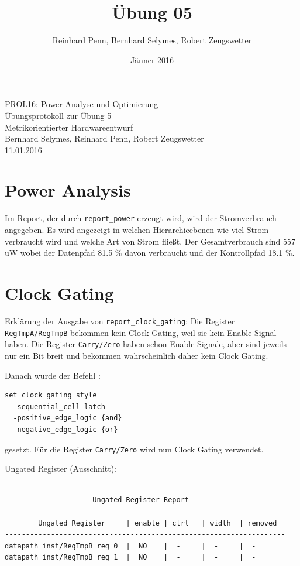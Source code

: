 \documentclass[12pt,a4paper]{article}
\begin{document}
\title{Übung 05}
\author{Reinhard Penn, Bernhard Selymes, Robert Zeugswetter}
\date{Jänner 2016}

\normalsize



\newcommand{\Uebung}{Power}
\newcommand{\srcpath}{../../src}
\newcommand{\simpath}{../../sim}
\newcommand{\synpath}{../../syn}



\begin{center}
PROL16: Power Analyse und Optimierung\\
Übungsprotokoll zur Übung 5\\
Metrikorientierter Hardwareentwurf\\
Bernhard Selymes, Reinhard Penn, Robert Zeugswetter\\
11.01.2016
\end{center}

\section{Power Analysis}
Im Report, der durch \texttt{report\_power} erzeugt wird, wird der Stromverbrauch angegeben. Es wird angezeigt in welchen Hierarchieebenen wie viel Strom verbraucht wird und welche Art von Strom fließt. Der Gesamtverbrauch sind 557 uW wobei der Datenpfad 81.5 \% davon verbraucht und der Kontrollpfad 18.1 \%.

\section{Clock Gating}
Erklärung der Ausgabe von \texttt{report\_clock\_gating}: Die Register \texttt{RegTmpA/RegTmpB} bekommen kein Clock Gating, weil sie kein Enable-Signal haben. Die Register \texttt{Carry/Zero} haben schon Enable-Signale, aber sind jeweils nur ein Bit breit und bekommen wahrscheinlich daher kein Clock Gating.

Danach wurde der Befehl :
\begin{verbatim}
set_clock_gating_style 
  -sequential_cell latch 
  -positive_edge_logic {and} 
  -negative_edge_logic {or}
\end{verbatim}
gesetzt. Für die Register \texttt{Carry/Zero} wird nun Clock Gating verwendet.

Ungated Register (Ausschnitt):
\begin{verbatim}
-------------------------------------------------------------------
                     Ungated Register Report
-------------------------------------------------------------------
        Ungated Register     | enable | ctrl   | width  | removed
-------------------------------------------------------------------
datapath_inst/RegTmpB_reg_0_ |  NO    |  -     |  -     |  -
datapath_inst/RegTmpB_reg_1_ |  NO    |  -     |  -     |  -
\end{verbatim}
\end{document}
